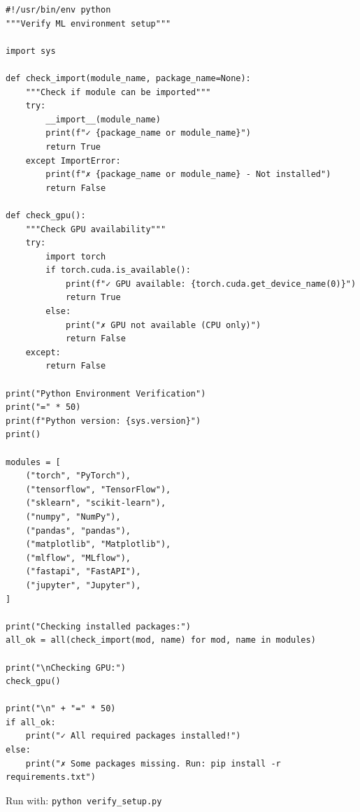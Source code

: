 \begin{lstlisting}[style=python, caption=verify\_setup.py]
#!/usr/bin/env python
"""Verify ML environment setup"""

import sys

def check_import(module_name, package_name=None):
    """Check if module can be imported"""
    try:
        __import__(module_name)
        print(f"✓ {package_name or module_name}")
        return True
    except ImportError:
        print(f"✗ {package_name or module_name} - Not installed")
        return False

def check_gpu():
    """Check GPU availability"""
    try:
        import torch
        if torch.cuda.is_available():
            print(f"✓ GPU available: {torch.cuda.get_device_name(0)}")
            return True
        else:
            print("✗ GPU not available (CPU only)")
            return False
    except:
        return False

print("Python Environment Verification")
print("=" * 50)
print(f"Python version: {sys.version}")
print()

modules = [
    ("torch", "PyTorch"),
    ("tensorflow", "TensorFlow"),
    ("sklearn", "scikit-learn"),
    ("numpy", "NumPy"),
    ("pandas", "pandas"),
    ("matplotlib", "Matplotlib"),
    ("mlflow", "MLflow"),
    ("fastapi", "FastAPI"),
    ("jupyter", "Jupyter"),
]

print("Checking installed packages:")
all_ok = all(check_import(mod, name) for mod, name in modules)

print("\nChecking GPU:")
check_gpu()

print("\n" + "=" * 50)
if all_ok:
    print("✓ All required packages installed!")
else:
    print("✗ Some packages missing. Run: pip install -r requirements.txt")
\end{lstlisting}

Run with: \texttt{python verify\_setup.py}
